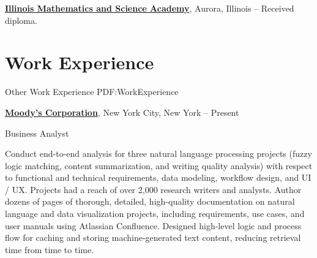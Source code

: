 \documentclass[letterpaper,10pt,oneside]{article}
\begin{document}
\begin{body}
\BigGap
\href{http://www.imsa.edu}
{\textbf{Illinois Mathematics and Science Academy}},
Aurora, Illinois
\hfill
{} --
\GapNoBreak
\BulletItem
Received diploma.


\noindent\hrulefill
\section
{Work\newline
Experience}
{Other Work Experience}
{PDF:WorkExperience}

\href{http://www.moodys.com}
{\textbf{Moody's Corporation}},
New York City, New York
\hfill
{} --
Present

\GapNoBreak
\BulletItem
Business Analyst
\begin{detail}
\SubBulletItem
Conduct end-to-end analysis for three natural language processing projects (fuzzy logic matching, content summarization, and writing quality analysis) with respect to functional and technical requirements, data modeling, workflow design, and UI / UX. Projects had a reach of over 2,000 research writers and analysts.
\SubBulletItem
Author dozens of pages of thorough, detailed, high-quality documentation on natural language and data visualization projects, including requirements, use cases, and user manuals using Atlassian Confluence.
\SubBulletItem
Designed high-level logic and process flow for caching and storing machine-generated text content, reducing retrieval time from  time to  time.
\end{detail}

\begin{comment}
\BigGapNoBreak
{\textbf{Trinity College Office of Enrollment}},
Hartford, Connecticut
\hfill
\DatestampYMD{2017}{08}{21} --
\DatestampYMD{2018}{05}{18}


\GapNoBreak
\BulletItem
Student Admissions Associate
\begin{detail}
\SubBulletItem
Conducted interviews with over 50 high school students, evaluating their standing as applicants, which resulted in 11 admitted students for the Class of 2022.
\SubBulletItem
Submitted written evaluations on each applicant to be added to applicant’s file.
\SubBulletItem
Led weekly group information sessions for prospective students, families, and admissions visitors.
\SubBulletItem
Participated in on-campus recruitment events, such as panels, special programs, and other projects.
\end{detail}
\end{comment}


\end{body}
\end{document}
